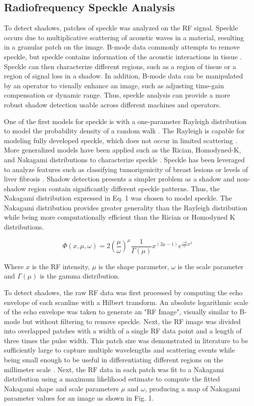 \documentclass[preprint,5p,authoryear]{elsarticle}
\begin{document}
\subsection*{Radiofrequency Speckle Analysis}      
To detect shadows, patches of speckle was analyzed on the RF signal. Speckle occurs due to multiplicative scattering of acoustic waves in a material, resulting in a granular patch on the image. B-mode data commonly attempts to remove speckle, but speckle contains information of the acoustic interactions in tissue \citep{Burckhardt1978}. Speckle can then characterize different regions, such as a region of tissue or a region of signal loss in a shadow. In addition, B-mode data can be manipulated by an operator to visually enhance an image, such as adjusting time-gain compensation or dynamic range. Thus, speckle analysis can provide a more robust shadow detection usable across different machines and operators.

One of the first models for speckle is with a one-parameter Rayleigh distribution to model the probability density of a random walk \citep{Burckhardt1978}. The Rayleigh is capable for modeling fully developed speckle, which does not occur in limited scattering \citep{Tuthill1988}. More generalized models have been applied such as the Rician, Homodyned-K, and Nakagami distributions to characterize speckle \citep{Destrempes2010}. Speckle has been leveraged to analyze features such as classifying tumorigenicity of breast lesions \citep{Byra2016} or levels of liver fibrosis \citep{Ho2012}. Shadow detection presents a simpler problem as a shadow and non-shadow region contain significantly different speckle patterns. Thus, the Nakagami distribution expressed in Eq. 1 was chosen to model speckle. The Nakagami distribution provides greater generality than the Rayleigh distribution while being more computationally efficient than the Rician or Homodyned K distributions.

\begin{equation}
\Phi(x,\mu,\omega) = 2(\frac{\mu}{\omega})^{\mu}\frac{1}{\Gamma(\mu)}x^{(2\mu-1)}e^{\frac{-\mu}{\omega}x^{2}}
\end{equation}

Where $x$ is the RF intensity, $\mu$ is the shape parameter, $\omega$ is the scale parameter and $\Gamma(\mu)$ is the gamma distribution.

To detect shadows, the raw RF data was first processed by computing the echo envelope of each scanline with a Hilbert transform. An absolute logarithmic scale of the echo envelope was taken to generate an "RF Image", visually similar to B-mode but without filtering to remove speckle. Next, the RF image was divided into overlapped patches with a width of a single RF data point and a length of three times the pulse width. This patch size was demonstrated in literature to be sufficiently large to capture multiple wavelengths and scattering events while being small enough to be useful in differentiating different regions on the millimeter scale \citep{Byra2016}. Next, the RF data in each patch was fit to a Nakagami distribution using a maximum likelihood estimate to compute the fitted Nakagami shape and scale parameters $\mu$ and $\omega$, producing a map of Nakagami parameter values for an image as shown in Fig. 1.
\end{document}
